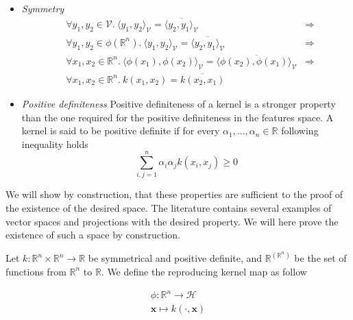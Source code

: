 \begin{itemize}
\item \textit{Symmetry}
  \begin{equation*}
    \begin{aligned}
      & \forall y_1, y_2 \in \mathcal{V}.\ 
      \langle y_1, y_2\rangle _{\mathcal{V}} = \overline{\langle y_2, y_1\rangle _{\mathcal{V}}} & \Rightarrow\\
      & \forall y_1, y_2 \in \phi(\mathbb{R}^n).\ 
      \langle y_1, y_2\rangle _{\mathcal{V}} = \overline{\langle y_2, y_1\rangle _{\mathcal{V}}} & \Rightarrow\\
      &\forall x_1, x_2 \in \mathbb{R}^n.\ 
      \langle \phi(x_1), \phi(x_2)\rangle _{\mathcal{V}} = \overline{\langle \phi(x_2), \phi(x_1)\rangle _{\mathcal{V}}} &\Rightarrow\\
      &\forall x_1, x_2 \in \mathbb{R}^n.\ 
         k\left(x_1, x_2\right) = \overline{k\left(x_2, x_1\right)}
    \end{aligned}
  \end{equation*}

\item \textit{Positive definiteness} Positive definiteness of a kernel is a stronger property than the one required for the positive definiteness in the features space. A kernel is said to be positive definite if for every $\alpha_1, ..., \alpha_n \in \mathbb{R}$ following inequality holds
  \begin{equation*}
    \sum_{i,j=1}^n\alpha_i\alpha_jk\left(x_i, x_j\right) \geq 0
  \end{equation*}
\end{itemize}

We will show by construction, that these properties are sufficient to the proof of the existence of the desired space. The literature contains several examples of vector spaces and projections with the desired property. We will here prove the existence of such a space by construction.

Let $k : \mathbb{R}^n \times \mathbb{R}^n \rightarrow \mathbb{R}$ be symmetrical and positive definite, and $\mathbb{R}^{(\mathbb{R}^n)}$ be the set of functions from $\mathbb{R}^n$ to $\mathbb{R}$. We define the reproducing kernel map as follow

\begin{equation}
  \begin{aligned}
    \phi : \mathbb{R}^n \rightarrow \mathcal{H}\\
    \mathbf{x} \mapsto k(\cdot, \mathbf{x})
  \end{aligned}
\end{equation}

